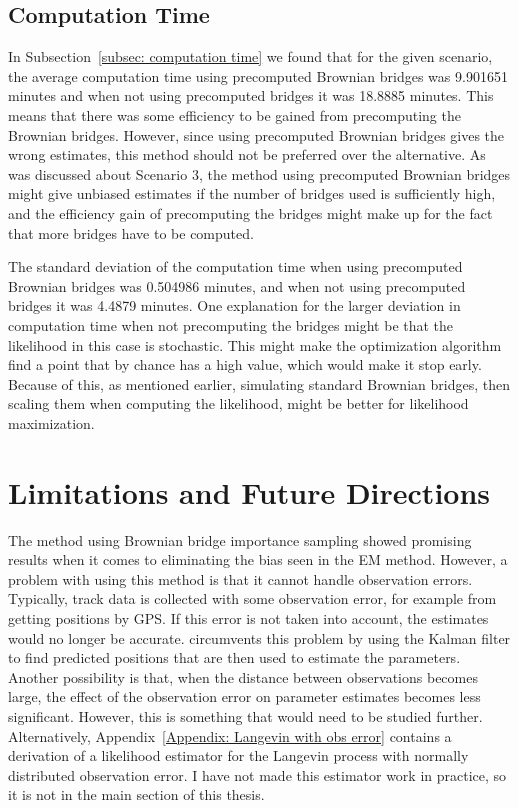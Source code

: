 \subsection{Computation Time}

In Subsection~\ref{subsec: computation time} we found that for the given scenario, the average computation time using precomputed Brownian bridges was 9.901651 minutes and when not using precomputed bridges it was 18.8885 minutes. This means that there was some efficiency to be gained from precomputing the Brownian bridges. However, since using precomputed Brownian bridges gives the wrong estimates, this method should not be preferred over the alternative. As was discussed about Scenario 3, the method using precomputed Brownian bridges might give unbiased estimates if the number of bridges used is sufficiently high, and the efficiency gain of precomputing the bridges might make up for the fact that more bridges have to be computed.


The standard deviation of the computation time when using precomputed Brownian bridges was 0.504986 minutes, and when not using precomputed bridges it was 4.4879 minutes. One explanation for the larger deviation in computation time when not precomputing the bridges might be that the likelihood in this case is stochastic. This might make the optimization algorithm find a point that by chance has a high value, which would make it stop early. Because of this, as mentioned earlier, simulating standard Brownian bridges, then scaling them when computing the likelihood, might be better for likelihood maximization.





\section{Limitations and Future Directions}
The method using Brownian bridge importance sampling showed promising results when it comes to eliminating the bias seen in the EM method. However, a problem with using this method is that it cannot handle observation errors. Typically, track data is collected with some observation error, for example from getting positions by GPS. If this error is not taken into account, the estimates would no longer be accurate. \parencite{michelot_langevin_2019} circumvents this problem by using the Kalman filter to find predicted positions that are then used to estimate the parameters. Another possibility is that, when the distance between observations becomes large, the effect of the observation error on parameter estimates becomes less significant. However, this is something that would need to be studied further. Alternatively, Appendix~\ref{Appendix: Langevin with obs error} contains a derivation of a likelihood estimator for the Langevin process with normally distributed observation error. I have not made this estimator work in practice, so it is not in the main section of this thesis.


